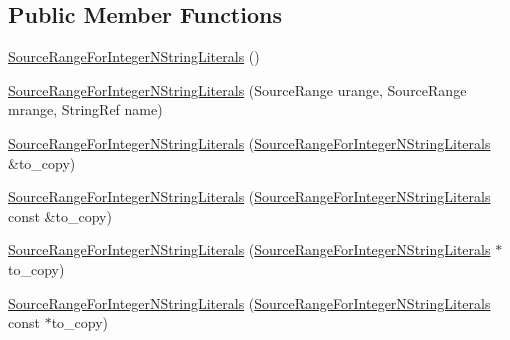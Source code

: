\subsection*{Public Member Functions}
\begin{DoxyCompactItemize}
\item 
\hyperlink{classclang_1_1tidy_1_1pagesjaunes_1_1_exec_s_q_l_l_o_b_read_to_function_call_1_1_source_range_for_integer_n_string_literals_a52fd7599f177c27fe806439086e4b902}{Source\+Range\+For\+Integer\+N\+String\+Literals} ()
\item 
\hyperlink{classclang_1_1tidy_1_1pagesjaunes_1_1_exec_s_q_l_l_o_b_read_to_function_call_1_1_source_range_for_integer_n_string_literals_a63a083a6180730ccc6858ba08cd6f0a8}{Source\+Range\+For\+Integer\+N\+String\+Literals} (Source\+Range urange, Source\+Range mrange, String\+Ref name)
\item 
\hyperlink{classclang_1_1tidy_1_1pagesjaunes_1_1_exec_s_q_l_l_o_b_read_to_function_call_1_1_source_range_for_integer_n_string_literals_ae28b4ddbf073ddfabd975e5eda087c35}{Source\+Range\+For\+Integer\+N\+String\+Literals} (\hyperlink{classclang_1_1tidy_1_1pagesjaunes_1_1_exec_s_q_l_l_o_b_read_to_function_call_1_1_source_range_for_integer_n_string_literals}{Source\+Range\+For\+Integer\+N\+String\+Literals} \&to\+\_\+copy)
\item 
\hyperlink{classclang_1_1tidy_1_1pagesjaunes_1_1_exec_s_q_l_l_o_b_read_to_function_call_1_1_source_range_for_integer_n_string_literals_ac16c3675f4ecb750d7f3366e96741842}{Source\+Range\+For\+Integer\+N\+String\+Literals} (\hyperlink{classclang_1_1tidy_1_1pagesjaunes_1_1_exec_s_q_l_l_o_b_read_to_function_call_1_1_source_range_for_integer_n_string_literals}{Source\+Range\+For\+Integer\+N\+String\+Literals} const \&to\+\_\+copy)
\item 
\hyperlink{classclang_1_1tidy_1_1pagesjaunes_1_1_exec_s_q_l_l_o_b_read_to_function_call_1_1_source_range_for_integer_n_string_literals_a7492219d7b9bf33123607fb538b296a1}{Source\+Range\+For\+Integer\+N\+String\+Literals} (\hyperlink{classclang_1_1tidy_1_1pagesjaunes_1_1_exec_s_q_l_l_o_b_read_to_function_call_1_1_source_range_for_integer_n_string_literals}{Source\+Range\+For\+Integer\+N\+String\+Literals} $\ast$to\+\_\+copy)
\item 
\hyperlink{classclang_1_1tidy_1_1pagesjaunes_1_1_exec_s_q_l_l_o_b_read_to_function_call_1_1_source_range_for_integer_n_string_literals_a8860b4af29b690cebcece32c3bf8bc84}{Source\+Range\+For\+Integer\+N\+String\+Literals} (\hyperlink{classclang_1_1tidy_1_1pagesjaunes_1_1_exec_s_q_l_l_o_b_read_to_function_call_1_1_source_range_for_integer_n_string_literals}{Source\+Range\+For\+Integer\+N\+String\+Literals} const $\ast$to\+\_\+copy)

\end{DoxyCompactItemize}
